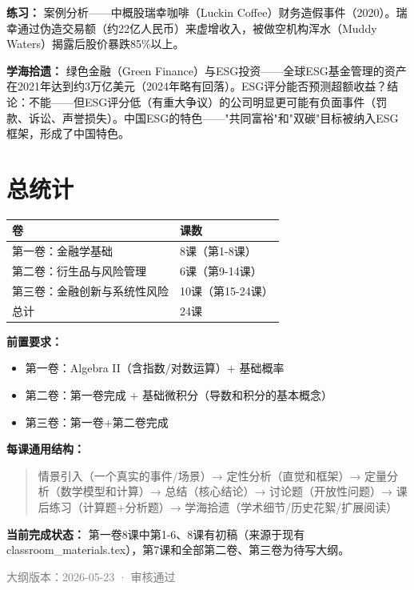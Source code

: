 \documentclass[a4paper,11pt]{ctexart}
\begin{document}
\begin{enumerate}
\textbf{练习：} 案例分析——中概股瑞幸咖啡（Luckin Coffee）财务造假事件（2020）。瑞幸通过伪造交易额（约22亿人民币）来虚增收入，被做空机构浑水（Muddy Waters）揭露后股价暴跌85\%以上。

\textbf{学海拾遗：} 绿色金融（Green Finance）与ESG投资——全球ESG基金管理的资产在2021年达到约3万亿美元（2024年略有回落）。ESG评分能否预测超额收益？结论：不能——但ESG评分低（有重大争议）的公司明显更可能有负面事件（罚款、诉讼、声誉损失）。中国ESG的特色——"共同富裕"和"双碳"目标被纳入ESG框架，形成了中国特色。

\end{enumerate}

\newpage

\section*{总统计}

\begin{center}
\begin{tabular}{ll}
\toprule
\textbf{卷} & \textbf{课数} \\
\midrule
第一卷：金融学基础 & 8课（第1-8课）\\
第二卷：衍生品与风险管理 & 6课（第9-14课）\\
第三卷：金融创新与系统性风险 & 10课（第15-24课）\\
\midrule
总计 & 24课 \\
\bottomrule
\end{tabular}
\end{center}

\vspace{0.3cm}

\noindent\textbf{前置要求：}
\begin{itemize}
  \item 第一卷：Algebra II（含指数/对数运算）+ 基础概率
  \item 第二卷：第一卷完成 + 基础微积分（导数和积分的基本概念）
  \item 第三卷：第一卷+第二卷完成
\end{itemize}

\noindent\textbf{每课通用结构：}
\begin{quote}
情景引入（一个真实的事件/场景）→ 定性分析（直觉和框架）→ 定量分析（数学模型和计算）→ 总结（核心结论）→ 讨论题（开放性问题）→ 课后练习（计算题+分析题）→ 学海拾遗（学术细节/历史花絮/扩展阅读）
\end{quote}

\noindent\textbf{当前完成状态：} 第一卷8课中第1-6、8课有初稿（来源于现有 classroom\_materials.tex），第7课和全部第二卷、第三卷为待写大纲。

\vspace{0.5cm}
\noindent\textcolor{gray}{\small 大纲版本：2026-05-23 · 审核通过}
\end{document}
